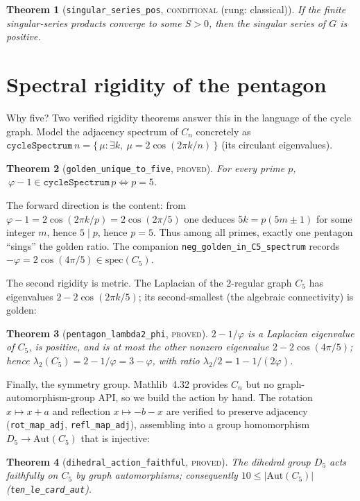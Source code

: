\documentclass[11pt]{article}
\newtheorem{theorem}{Theorem}[section]
\theoremstyle{definition}
\theoremstyle{remark}
\newcommand{\phigr}{\varphi}
\newcommand{\lean}[1]{\texttt{#1}}
\begin{document}
\begin{theorem}[\lean{singular\_series\_pos}, \textsc{conditional} (rung: classical)]
If the finite singular-series products converge to some $S>0$, then the singular series of $G$
is positive.
\end{theorem}

\section{Spectral rigidity of the pentagon}\label{sec:spectral}

Why five? Two verified rigidity theorems answer this in the language of the cycle graph. Model
the adjacency spectrum of $C_n$ concretely as
$\lean{cycleSpectrum}\,n=\{\,\mu : \exists k,\ \mu=2\cos(2\pi k/n)\,\}$ (its circulant
eigenvalues).

\begin{theorem}[\lean{golden\_unique\_to\_five}, \textsc{proved}]\label{thm:unique}
For every prime $p$, $\ \phigr-1\in\lean{cycleSpectrum}\,p \iff p=5$.
\end{theorem}

\noindent The forward direction is the content: from $\phigr-1=2\cos(2\pi k/p)=2\cos(2\pi/5)$
one deduces $5k=p(5m\pm1)$ for some integer $m$, hence $5\mid p$, hence $p=5$. Thus among all
primes, exactly one pentagon ``sings'' the golden ratio. The companion
\lean{neg\_golden\_in\_C5\_spectrum} records $-\phigr=2\cos(4\pi/5)\in\mathrm{spec}(C_5)$.

The second rigidity is metric. The Laplacian of the $2$-regular graph $C_5$ has eigenvalues
$2-2\cos(2\pi k/5)$; its second-smallest (the algebraic connectivity) is golden:

\begin{theorem}[\lean{pentagon\_lambda2\_phi}, \textsc{proved}]\label{thm:lambda2}
$2-1/\phigr$ is a Laplacian eigenvalue of $C_5$, is positive, and is at most the other nonzero
eigenvalue $2-2\cos(4\pi/5)$; hence $\lambda_2(C_5)=2-1/\phigr=3-\phigr$, with ratio
$\lambda_2/2=1-1/(2\phigr)$.
\end{theorem}

Finally, the symmetry group. Mathlib~4.32 provides $C_n$ but no graph-automorphism-group API,
so we build the action by hand. The rotation $x\mapsto x+a$ and reflection $x\mapsto -b-x$ are
verified to preserve adjacency (\lean{rot\_map\_adj}, \lean{refl\_map\_adj}), assembling into a
group homomorphism $D_5\to\mathrm{Aut}(C_5)$ that is injective:

\begin{theorem}[\lean{dihedral\_action\_faithful}, \textsc{proved}]
The dihedral group $D_5$ acts faithfully on $C_5$ by graph automorphisms; consequently
$10\le\lvert\mathrm{Aut}(C_5)\rvert$ (\lean{ten\_le\_card\_aut}).
\end{theorem}
\end{document}
